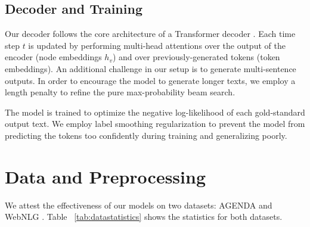 \documentclass[11pt,a4paper]{article}
\begin{document}
\vspace{0.5mm}
\subsection{Decoder and Training}
\label{sec:lp}
Our decoder follows the core architecture of a Transformer decoder \cite{NIPS2017_7181}. Each time step $t$ is updated by performing multi-head attentions over the output of the encoder (node embeddings $h_v$) and over previously-generated tokens (token embeddings). An additional challenge in our setup is to generate multi-sentence outputs. In order to encourage the model to generate longer texts, we employ a length penalty \cite{DBLP:journals/corr/WuSCLNMKCGMKSJL16} to refine the pure max-probability beam search. 

The model is trained to optimize the negative log-likelihood of each gold-standard output text. We employ label smoothing regularization to prevent the model from predicting the tokens too confidently during training and generalizing poorly.







 

\section{Data and Preprocessing}

We attest the effectiveness of our models on two datasets: AGENDA \cite{koncel-kedziorski-etal-2019-text} and WebNLG \cite{gardent-etal-2017-webnlg}. Table ~\ref{tab:datastatistics} shows the statistics for both datasets.
\end{document}
